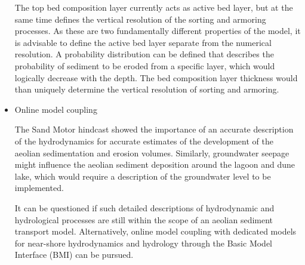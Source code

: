\begin{itemize}
  The top bed composition layer currently acts as active bed layer,
  but at the same time defines the vertical resolution of the sorting
  and armoring processes. As these are two fundamentally different
  properties of the model, it is advisable to define the active bed
  layer separate from the numerical resolution. A probability
  distribution can be defined that describes the probability of
  sediment to be eroded from a specific layer, which would logically
  decrease with the depth. The bed composition layer thickness would
  than uniquely determine the vertical resolution of sorting and
  armoring.

\item Online model coupling

  The Sand Motor hindcast showed the importance of an accurate
  description of the hydrodynamics for accurate estimates of the
  development of the aeolian sedimentation and erosion
  volumes. Similarly, groundwater seepage might influence the aeolian
  sediment deposition around the lagoon and dune lake, which would
  require a description of the groundwater level to be implemented.

  It can be questioned if such detailed descriptions of hydrodynamic
  and hydrological processes are still within the scope of an aeolian
  sediment transport model. Alternatively, online model coupling with
  dedicated models for near-shore hydrodynamics and hydrology through
  the Basic Model Interface (BMI) can be pursued.

\end{itemize}





